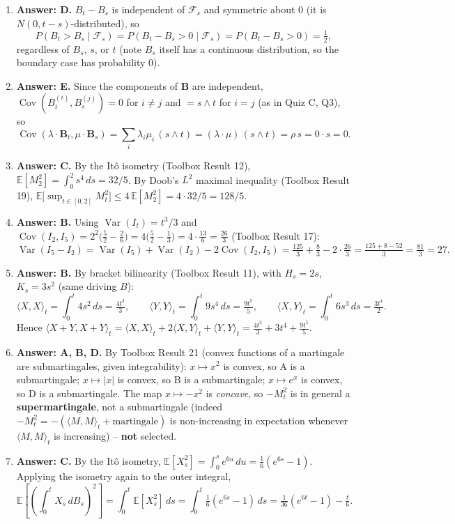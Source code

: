\documentclass[11pt]{article}
\newcommand{\E}{\mathbb{E}}
\DeclareMathOperator{\Var}{Var}
\DeclareMathOperator{\Cov}{Cov}
\newcommand{\ans}[1]{\par\noindent\textbf{\color{blue!50!black}Answer: #1}}
\begin{document}
\begin{enumerate}
\item[\textbf{Q10.}] \ans{D.} $B_t-B_s$ is independent of $\mathcal F_s$ and symmetric about $0$ (it is $N(0,t-s)$-distributed), so
\[
P(B_t>B_s\mid\mathcal F_s)=P(B_t-B_s>0\mid\mathcal F_s)=P(B_t-B_s>0)=\tfrac12,
\]
regardless of $B_s$, $s$, or $t$ (note $B_s$ itself has a continuous distribution, so the boundary case has probability $0$).

\item[\textbf{Q11.}] \ans{E.} Since the components of $\boldsymbol B$ are independent, $\Cov(B^{(i)}_t,B^{(j)}_s)=0$ for $i\ne j$ and $=s\wedge t$ for $i=j$ (as in Quiz C, Q3), so
\[
\Cov(\lambda\cdot\boldsymbol B_t,\mu\cdot\boldsymbol B_s)=\sum_i\lambda_i\mu_i\,(s\wedge t)=(\lambda\cdot\mu)\,(s\wedge t)=\rho\,s=0\cdot s=0.
\]

\item[\textbf{Q12.}] \ans{C.} By the It\^o isometry (Toolbox Result 12), $\E[M_2^2]=\int_0^2s^4\,ds=32/5$. By Doob's $L^2$ maximal inequality (Toolbox Result 19), $\E\big[\sup_{t\in[0,2]}M_t^2\big]\le4\,\E[M_2^2]=4\cdot32/5=128/5$.

\item[\textbf{Q13.}] \ans{B.} Using $\Var(I_t)=t^3/3$ and $\Cov(I_2,I_5)=2^2\big(\tfrac52-\tfrac26\big)=4\big(\tfrac52-\tfrac13\big)=4\cdot\tfrac{13}6=\tfrac{26}3$ (Toolbox Result 17):
\[
\Var(I_5-I_2)=\Var(I_5)+\Var(I_2)-2\Cov(I_2,I_5)=\tfrac{125}3+\tfrac83-2\cdot\tfrac{26}3=\tfrac{125+8-52}3=\tfrac{81}3=27.
\]

\item[\textbf{Q14.}] \ans{B.} By bracket bilinearity (Toolbox Result 11), with $H_s=2s$, $K_s=3s^2$ (same driving $B$):
\[
\langle X,X\rangle_t=\int_0^t4s^2\,ds=\tfrac{4t^3}3,\qquad
\langle Y,Y\rangle_t=\int_0^t9s^4\,ds=\tfrac{9t^5}5,\qquad
\langle X,Y\rangle_t=\int_0^t6s^3\,ds=\tfrac{3t^4}2.
\]
Hence $\langle X+Y,X+Y\rangle_t=\langle X,X\rangle_t+2\langle X,Y\rangle_t+\langle Y,Y\rangle_t=\tfrac{4t^3}3+3t^4+\tfrac{9t^5}5$.

\item[\textbf{Q15.}] \ans{A, B, D.} By Toolbox Result 21 (convex functions of a martingale are submartingales, given integrability): $x\mapsto x^2$ is convex, so A is a submartingale; $x\mapsto|x|$ is convex, so B is a submartingale; $x\mapsto e^x$ is convex, so D is a submartingale. The map $x\mapsto-x^2$ is \emph{concave}, so $-M_t^2$ is in general a \textbf{supermartingale}, not a submartingale (indeed $-M_t^2=-(\langle M,M\rangle_t+\text{martingale})$ is non-increasing in expectation whenever $\langle M,M\rangle_t$ is increasing) -- \textbf{not} selected.

\item[\textbf{Q16.}] \ans{C.} By the It\^o isometry, $\E[X_s^2]=\int_0^se^{6u}\,du=\tfrac16(e^{6s}-1)$. Applying the isometry again to the outer integral,
\[
\E\left[\left(\int_0^tX_s\,dB_s\right)^2\right]=\int_0^t\E[X_s^2]\,ds=\int_0^t\tfrac16(e^{6s}-1)\,ds=\tfrac1{36}(e^{6t}-1)-\tfrac t6.
\]

\end{enumerate}
\end{document}
